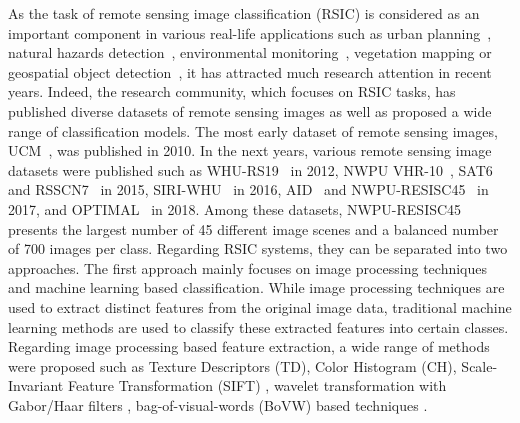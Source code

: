 \documentclass[sigconf]{acmart}
\begin{document}
As the task of remote sensing image classification (RSIC) is considered as an important component in various real-life applications such as urban planning~\cite{thapa2009urban, netzband2007applied}, natural hazards detection~\cite{poursanidis2017remote, van2013remote}, environmental monitoring~\cite{van2013remote}, vegetation mapping or geospatial object detection~\cite{feng2015uav}, it has attracted much research attention in recent years.
Indeed, the research community, which focuses on RSIC tasks, has published diverse datasets of remote sensing images as well as proposed a wide range of classification models.
The most early dataset of remote sensing images, UCM~\cite{yang2010bag}, was published in 2010.
In the next years, various remote sensing image datasets were published such as WHU-RS19~\cite{Xia2010WHURS19} in 2012, NWPU VHR-10~\cite{cheng2014multi}, SAT6~\cite{basu2015deepsat} and RSSCN7~\cite{zou2015deep} in 2015, SIRI-WHU~\cite{zhao2015dirichlet} in 2016, AID~\cite{xia2017aid} and NWPU-RESISC45~\cite{cheng2017remote} in 2017, and OPTIMAL~\cite{wang2018scene} in 2018.
Among these datasets, NWPU-RESISC45~\cite{cheng2017remote} presents the largest number of 45 different image scenes and a balanced number of 700 images per class.
Regarding RSIC systems, they can be separated into two approaches.
The first approach mainly focuses on image processing techniques and machine learning based classification.   
While image processing techniques are used to extract distinct features from the original image data, traditional machine learning methods are used to classify these extracted features into certain classes. 
Regarding image processing based feature extraction, a wide range of methods were proposed such as Texture Descriptors (TD), Color Histogram (CH), Scale-Invariant Feature Transformation (SIFT) \cite{yang2008comparing}, wavelet transformation with Gabor/Haar filters \cite{elmannai2013support, elmannai2016new}, bag-of-visual-words (BoVW) based techniques \cite{yang2010bag, sridharan2014bag}.
\end{document}

